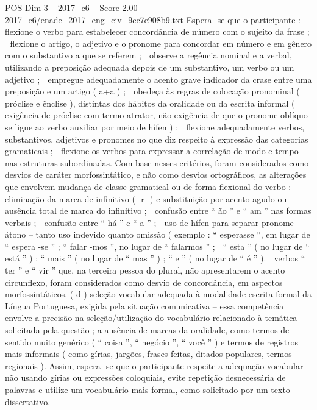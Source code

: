 \begin{textsample}{POS Dim 3 – 2017\_c6 – Score 2.00 – 2017\_c6/enade\_2017\_eng\_civ\_9cc7e908b9.txt}
Espera -se que o participante :  flexione o verbo para estabelecer concordância de número com o sujeito da frase ;  flexione o artigo, o adjetivo e o pronome para concordar em número e em gênero com o substantivo a que se referem ;  observe a regência nominal e a verbal, utilizando a preposição adequada depois de um substantivo, um verbo ou um adjetivo ;  empregue adequadamente o acento grave indicador da crase entre uma preposição e um artigo ( a+a ) ;  obedeça às regras de colocação pronominal ( próclise e ênclise ), distintas dos hábitos da oralidade ou da escrita informal ( exigência de próclise com termo atrator, não exigência de que o pronome oblíquo se ligue ao verbo auxiliar por meio de hífen ) ;  flexione adequadamente verbos, substantivos, adjetivos e pronomes no que diz respeito à expressão das categorias gramaticais ;  flexione os verbos para expressar a correlação de modo e tempo nas estruturas subordinadas.
Com base nesses critérios, foram considerados como desvios de caráter morfossintático, e não como desvios ortográficos, as alterações que envolvem mudança de classe gramatical ou de forma flexional do verbo :  eliminação da marca de infinitivo ( -r- ) e substituição por acento agudo ou ausência total de marca do infinitivo ;  confusão entre “ ão ” e “ am ” nas formas verbais ;  confusão entre “ há ” e “ a ” ;  uso de hífen para separar pronome átono – tanto uso indevido quanto omissão ( exemplo : “ esperasse ”, em lugar de “ espera -se ” ; “ falar -mos ”, no lugar de “ falarmos ” ;  “ esta ” ( no lugar de “ está ” ) ; “ mais ” ( no lugar de “ mas ” ) ; “ e ” ( no lugar de “ é ” ).  verbos “ ter ” e “ vir ” que, na terceira pessoa do plural, não apresentarem o acento circunflexo, foram considerados como desvio de concordância, em aspectos morfossintáticos. ( d ) seleção vocabular adequada à modalidade escrita formal da Língua Portuguesa, exigida pela situação comunicativa – essa competência envolve a precisão na seleção/utilização do vocabulário relacionado à temática solicitada pela questão ; a ausência de marcas da oralidade, como termos de sentido muito genérico ( “ coisa ”, “ negócio ”, “ você ” ) e termos de registros mais informais ( como gírias, jargões, frases feitas, ditados populares, termos regionais ).
Assim, espera -se que o participante respeite a adequação vocabular não usando gírias ou expressões coloquiais, evite repetição desnecessária de palavras e utilize um vocabulário mais formal, como solicitado por um texto dissertativo.

\end{textsample}
